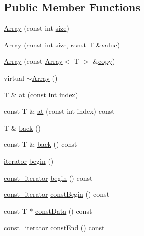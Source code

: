 \subsection*{Public Member Functions}
\begin{DoxyCompactItemize}
\item 
\hyperlink{classprism_1_1_array_aab128f1ed5a4547a04812b921dc75897}{Array} (const int \hyperlink{classprism_1_1_array_a83c88f0f351ac35798f40ed4e922e187}{size})
\item 
\hyperlink{classprism_1_1_array_ac696e19a99b7a601f013352617689098}{Array} (const int \hyperlink{classprism_1_1_array_a83c88f0f351ac35798f40ed4e922e187}{size}, const T \&\hyperlink{classprism_1_1_array_a2c5690996975510eed7112066b936d8f}{value})
\item 
\hyperlink{classprism_1_1_array_a15f0a0b32b4d95975fd15f0c1321d144}{Array} (const \hyperlink{classprism_1_1_array}{Array}$<$ T $>$ \&\hyperlink{namespaceprism_ae776f4cd825f79e7af1cf6ee1d90a209}{copy})
\item 
virtual \hyperlink{classprism_1_1_array_ad8787402f15054e257a7b407f07f469e}{$\sim$\+Array} ()
\item 
T \& \hyperlink{classprism_1_1_array_a669341733bb97105adcedc9a9e159dcd}{at} (const int index)
\item 
const T \& \hyperlink{classprism_1_1_array_ae88b7be661d69a754c1a9a49adb7e9b7}{at} (const int index) const 
\item 
T \& \hyperlink{classprism_1_1_array_a23345041d2c537ad6cffc7e2a3afcfe4}{back} ()
\item 
const T \& \hyperlink{classprism_1_1_array_a4efee82c9091e2656d65ea5a9a2c2fd8}{back} () const 
\item 
\hyperlink{classprism_1_1_array_a6814c2af67e8b3fc48b02319f5e63d50}{iterator} \hyperlink{classprism_1_1_array_a2458620d3d5270c7ce2cb6413b65e731}{begin} ()
\item 
\hyperlink{classprism_1_1_array_ab78c83a88959a72d59e5f930540be94a}{const\+\_\+iterator} \hyperlink{classprism_1_1_array_a37f88fd8b0776145a47e7d14b7681d28}{begin} () const 
\item 
\hyperlink{classprism_1_1_array_ab78c83a88959a72d59e5f930540be94a}{const\+\_\+iterator} \hyperlink{classprism_1_1_array_a08b8bf28cf5ee167e240792923c90415}{const\+Begin} () const 
\item 
const T $\ast$ \hyperlink{classprism_1_1_array_af6e860868e38d2779f0839e1815ea0bd}{const\+Data} () const 
\item 
\hyperlink{classprism_1_1_array_ab78c83a88959a72d59e5f930540be94a}{const\+\_\+iterator} \hyperlink{classprism_1_1_array_a275ef3df386f5f8c3c785a0eba0f15a0}{const\+End} () const 

\end{DoxyCompactItemize}
